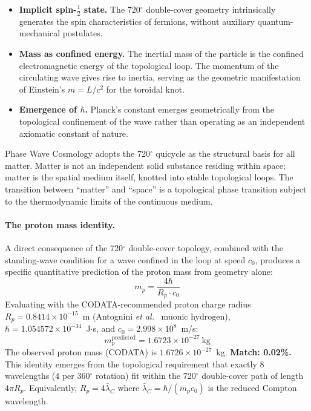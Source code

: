 \documentclass[aps,prd,twocolumn,superscriptaddress,amsmath,amssymb,nofootinbib,floatfix]{revtex4-2}
\newcommand{\cnaught}{c_{0}}
\begin{document}
\begin{itemize}
\item \textbf{Implicit spin-$\tfrac{1}{2}$ state.} The 720$^{\circ}$ double-cover geometry intrinsically generates the spin characteristics of fermions, without auxiliary quantum-mechanical postulates.
\item \textbf{Mass as confined energy.} The inertial mass of the particle is the confined electromagnetic energy of the topological loop. The momentum of the circulating wave gives rise to inertia, serving as the geometric manifestation of Einstein's $m = L/c^2$ for the toroidal knot.
\item \textbf{Emergence of $\hbar$.} Planck's constant emerges geometrically from the topological confinement of the wave rather than operating as an independent axiomatic constant of nature.
\end{itemize}

Phase Wave Cosmology adopts the 720$^{\circ}$ quicycle as the structural basis for all matter. Matter is not an independent solid substance residing within space; matter is the spatial medium itself, knotted into stable topological loops. The transition between ``matter'' and ``space'' is a topological phase transition subject to the thermodynamic limits of the continuous medium.

\paragraph*{The proton mass identity.}
A direct consequence of the 720$^{\circ}$ double-cover topology, combined with the standing-wave condition for a wave confined in the loop at speed $\cnaught$, produces a specific quantitative prediction of the proton mass from geometry alone:
\begin{equation}
\boxed{m_p = \frac{4\hbar}{R_p \cdot \cnaught}}
\label{eq:mp}
\end{equation}
Evaluating with the CODATA-recommended proton charge radius $R_p = 0.8414 \times 10^{-15}$~m (Antognini \emph{et al.}~\cite{Antognini2013} muonic hydrogen), $\hbar = 1.054572 \times 10^{-34}$~J$\cdot$s, and $\cnaught = 2.998 \times 10^{8}$~m/s:
\begin{equation}
m_p^{\text{predicted}} = 1.6723 \times 10^{-27}~\text{kg}
\end{equation}
The observed proton mass (CODATA) is $1.6726 \times 10^{-27}$~kg. \textbf{Match: 0.02\%.} This identity emerges from the topological requirement that exactly 8 wavelengths (4 per 360$^{\circ}$ rotation) fit within the 720$^{\circ}$ double-cover path of length $4\pi R_p$. Equivalently, $R_p = 4\bar{\lambda}_C$ where $\bar{\lambda}_C = \hbar/(m_p \cnaught)$ is the reduced Compton wavelength.
\end{document}
